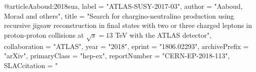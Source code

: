 @article{Aaboud:2018sua,
      label          = "ATLAS-SUSY-2017-03",
      author         = "Aaboud, Morad and others",
      title          = "{Search for chargino-neutralino production using
                        recursive jigsaw reconstruction in final states with two
                        or three charged leptons in proton-proton collisions at
                        $\sqrt{s}=13$ TeV with the ATLAS detector}",
      collaboration  = "ATLAS",
      year           = "2018",
      eprint         = "1806.02293",
      archivePrefix  = "arXiv",
      primaryClass   = "hep-ex",
      reportNumber   = "CERN-EP-2018-113",
      SLACcitation   = "%
}

